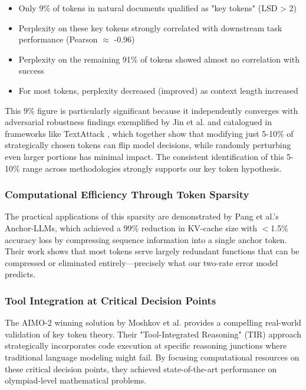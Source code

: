 \documentclass{article}
\begin{document}
\begin{itemize}
\item Only 9\% of tokens in natural documents qualified as "key tokens" (LSD > 2)
\item Perplexity on these key tokens strongly correlated with downstream task performance (Pearson $\approx$ -0.96)
\item Perplexity on the remaining 91\% of tokens showed almost no correlation with success
\item For most tokens, perplexity decreased (improved) as context length increased
\end{itemize}

This 9\% figure is particularly significant because it independently converges with adversarial robustness findings exemplified by Jin et al. \citep{jin2020textfooler} and catalogued in frameworks like TextAttack \citep{morris2022textattack}, which together show that modifying just 5-10\% of strategically chosen tokens can flip model decisions, while randomly perturbing even larger portions has minimal impact. The consistent identification of this 5-10\% range across methodologies strongly supports our key token hypothesis.

\subsubsection{Computational Efficiency Through Token Sparsity}

The practical applications of this sparsity are demonstrated by Pang et al.'s \citep{pang2024anchor} Anchor-LLMs, which achieved a 99\% reduction in KV-cache size with $<$1.5\% accuracy loss by compressing sequence information into a single anchor token. Their work shows that most tokens serve largely redundant functions that can be compressed or eliminated entirely---precisely what our two-rate error model predicts.

\subsubsection{Tool Integration at Critical Decision Points}

The AIMO-2 winning solution by Moshkov et al. \citep{moshkov2025aimo} provides a compelling real-world validation of key token theory. Their "Tool-Integrated Reasoning" (TIR) approach strategically incorporates code execution at specific reasoning junctions where traditional language modeling might fail. By focusing computational resources on these critical decision points, they achieved state-of-the-art performance on olympiad-level mathematical problems.
\end{document}
